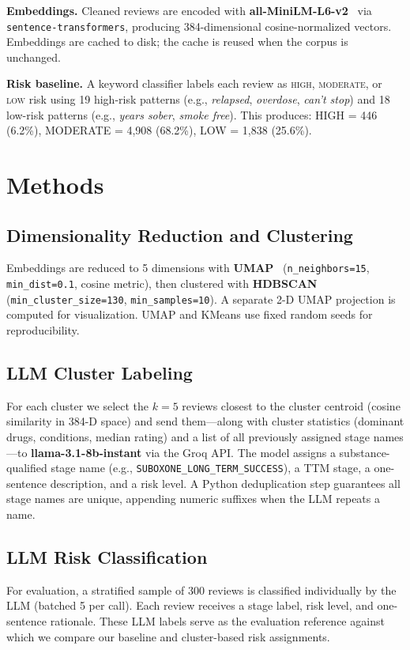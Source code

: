 \documentclass[10pt,twocolumn]{article}
\begin{document}
\textbf{Embeddings.} Cleaned reviews are encoded with
\textbf{all-MiniLM-L6-v2}~\cite{reimers2019} via
\texttt{sentence-transformers}, producing 384-dimensional cosine-normalized
vectors. Embeddings are cached to disk; the cache is reused when the corpus
is unchanged.

\textbf{Risk baseline.} A keyword classifier labels each review as
\textsc{high}, \textsc{moderate}, or \textsc{low} risk using 19 high-risk
patterns (e.g., \textit{relapsed}, \textit{overdose}, \textit{can't stop})
and 18 low-risk patterns (e.g., \textit{years sober}, \textit{smoke free}).
This produces: HIGH = 446 (6.2\%), MODERATE = 4,908 (68.2\%),
LOW = 1,838 (25.6\%).

\section{Methods}

\subsection{Dimensionality Reduction and Clustering}
Embeddings are reduced to 5 dimensions with
\textbf{UMAP}~\cite{mcinnes2018} (\texttt{n\_neighbors=15},
\texttt{min\_dist=0.1}, cosine metric), then clustered with
\textbf{HDBSCAN}~\cite{campello2013} (\texttt{min\_cluster\_size=130},
\texttt{min\_samples=10}). A separate 2-D UMAP projection is computed for
visualization. UMAP and KMeans use fixed random seeds for reproducibility.

\subsection{LLM Cluster Labeling}
For each cluster we select the $k=5$ reviews closest to the cluster
centroid (cosine similarity in 384-D space) and send them---along with
cluster statistics (dominant drugs, conditions, median rating) and a list
of all previously assigned stage names---to \textbf{llama-3.1-8b-instant}
via the Groq API. The model assigns a substance-qualified stage name
(e.g., \texttt{SUBOXONE\_LONG\_TERM\_SUCCESS}), a TTM stage, a one-sentence
description, and a risk level. A Python deduplication step guarantees all
stage names are unique, appending numeric suffixes when the LLM repeats a
name.

\subsection{LLM Risk Classification}
For evaluation, a stratified sample of 300 reviews is classified
individually by the LLM (batched 5 per call). Each review receives a stage
label, risk level, and one-sentence rationale. These LLM labels serve as
the evaluation reference against which we compare our baseline and
cluster-based risk assignments.
\end{document}
